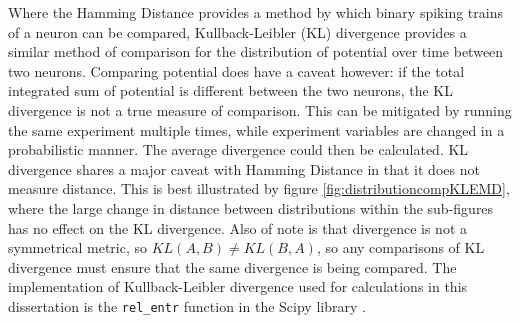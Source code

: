 Where the Hamming Distance provides a method by which binary spiking trains of a
neuron can be compared, Kullback-Leibler (KL) divergence provides a similar
method of comparison for the distribution of potential over time between two
neurons. Comparing potential does have a caveat however: if the total integrated
sum of potential is different between the two neurons, the KL divergence is not
a true measure of comparison. This can be mitigated by running the same
experiment multiple times, while experiment variables are changed in a
probabilistic manner. The average divergence could then be calculated. KL
divergence shares a major caveat with Hamming Distance in that it does not
measure distance. This is best illustrated by figure
\ref{fig:distributioncompKLEMD}, where the large change in distance between
distributions within the sub-figures has no effect on the KL divergence. Also of
note is that divergence is not a symmetrical metric, so $KL(A, B) \neq KL(B,
A)$, so any comparisons of KL divergence must ensure that the same divergence is
being compared. The implementation of Kullback-Leibler divergence used for
calculations in this dissertation is the \texttt{rel\_entr} function in the Scipy
library \autocite{scipy_scipyspecialrel_entr_2020}.

